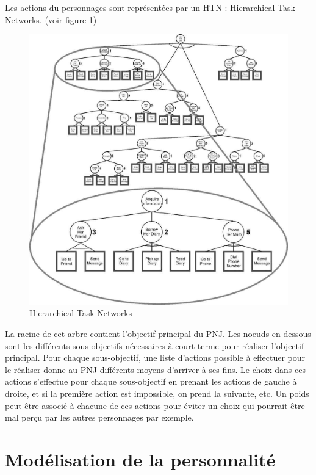 \documentclass[asi]{picINSA}
\begin{document}
Les actions du personnages sont représentées par un HTN : Hierarchical Task Networks. (voir figure \ref{fig:htn})\\
\begin{figure}[h!]
  \centering
  \includegraphics[scale=0.4]{images/htn.png}
  \caption{Hierarchical Task Networks}
  \label{fig:htn}
\end{figure}

La racine de cet arbre contient l'objectif principal du PNJ. Les noeuds en dessous sont les différents sous-objectifs nécessaires à court terme pour réaliser l'objectif principal. Pour chaque sous-objectif, une liste d'actions possible à effectuer pour le réaliser donne au PNJ différents moyens d'arriver à ses fins. Le choix dans ces actions s'effectue pour chaque sous-objectif en prenant les actions de gauche à droite, et si la première action est impossible, on prend la suivante, etc. Un poids peut être associé à chacune de ces actions pour éviter un choix qui pourrait être mal perçu par les autres personnages par exemple.\\


\section{Modélisation de la personnalité}
\end{document}
